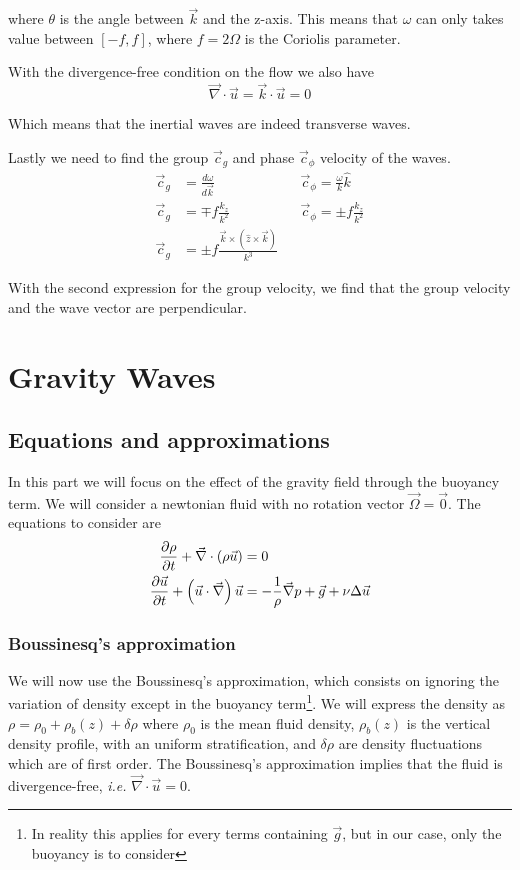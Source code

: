 where $\theta$ is the angle between $\vec{k}$ and the z-axis. This means that $\omega$ can only takes value between $[-f, f]$, where $f = 2 \Omega$ is the Coriolis parameter.

With the divergence-free condition on the flow we also have 
\begin{equation*}
	\vec{\nabla} \cdot \vec{u} = \vec{k} \cdot \vec{u} = 0
\end{equation*}

Which means that the inertial waves are indeed transverse waves.

Lastly we need to find the group $\vec{c}_g$ and phase $\vec{c}_\phi$  velocity of the waves.
\begin{align*}
    \vec{c}_g & = \frac{d \omega}{d\vec{k}} && \vec{c}_\phi = \frac{\omega}{k} \hat{k} \\
    \vec{c}_g & = \mp f \frac{k_z}{k^2} && \vec{c}_\phi = \pm f \frac{k_z}{k^2} \\
    \vec{c}_g & = \pm f \frac{\vec{k} \times \left( \hat{z} \times \vec{k} \right)}{k^3}
\end{align*}

With the second expression for the group velocity, we find that the group velocity and the wave vector are perpendicular.

\section{Gravity Waves}
\label{sec:Gravity}
\subsection{Equations and approximations}
In this part we will focus on the effect of the gravity field through the buoyancy term. We will consider a newtonian fluid with no rotation vector $\vec{\Omega} = \vec{0}$. The equations to consider are
\begin{align}
	\frac{\partial \rho}{\partial t} + \vec{\nabla} \cdot \left( \rho \vec{u} \right) & = 0 \\
	\frac{\partial \vec{u}}{\partial t} + \left( \vec{u} \cdot \vec{\nabla} \right) \vec{u} & = - \frac{1}{\rho} \vec{\nabla} p +  \vec{g} + \nu \Delta \vec{u}
\end{align}

\subsubsection{Boussinesq's approximation}
We will now use the Boussinesq's approximation, which consists on ignoring the variation of density except in the buoyancy term\footnote{In reality this applies for every terms containing $\vec{g}$, but in our case, only the buoyancy is to consider}. We will express the density as $\rho = \rho_0 + \rho_b(z) + \delta \rho$ where $\rho_0$ is the mean fluid density, $\rho_b(z)$ is the vertical density profile, with an uniform stratification, and $\delta \rho$ are density fluctuations which are of first order. The Boussinesq's approximation implies that the fluid is divergence-free, \textit{i.e.} $\vec{\nabla} \cdot \vec{u} = 0$.

